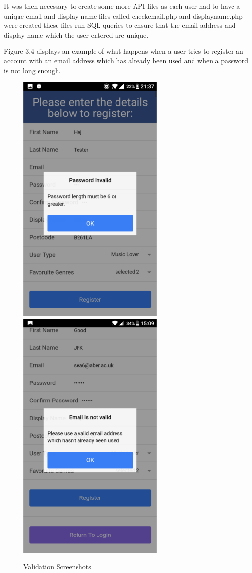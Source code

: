It was then necessary to create some more API files as each user had to have a unique email and display name files called checkemail.php and displayname.php were created these files run SQL queries to ensure that the email address and display name which the user entered are unique.

Figure 3.4 displays an example of what happens when a user tries to register an account with an email address which has already been used and when a password is not long enough.

\begin{figure}[H]
\includegraphics[scale=0.5]{images/sc5}
\includegraphics[scale=0.5]{images/sc6}
\caption{Validation Screenshots}
\end{figure}

